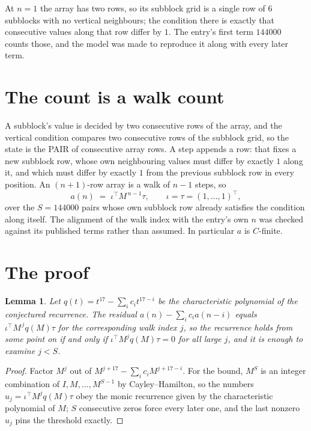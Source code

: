 \documentclass[11pt,a4paper]{article}
\theoremstyle{plain}
\newtheorem{lemma}[theorem]{Lemma}
\theoremstyle{definition}
\begin{document}
At $n=1$ the array has two rows, so its subblock grid is a single row of $6$ subblocks with
no vertical neighbours; the condition there is exactly that consecutive values along that row
differ by $1$. The entry's first term $144000$ counts those, and the model was made to
reproduce it along with every later term.

\section{The count is a walk count}

A subblock's value is decided by two consecutive rows of the array, and the
vertical condition compares two consecutive rows of the subblock grid, so the state is the
PAIR of consecutive array rows. A step appends a row: that fixes a new subblock row, whose own
neighbouring values must differ by exactly $1$ along it, and which must differ by exactly
$1$ from the previous subblock row in every position. An $(n+1)$-row array is a walk of
$n-1$ steps, so
\[
a(n)\;=\;\iota^{\!\top}M^{\,n-1}\tau,\qquad\iota=\tau=(1,\dots,1)^{\!\top},
\]
over the $S=144000$ pairs whose own subblock row already satisfies the condition along itself.
The alignment of the walk index with the entry's own $n$ was checked against its published
terms rather than assumed. In particular $a$ is $C$-finite.

\section{The proof}

\begin{lemma}\label{lem:crit}
Let $q(t)=t^{17}-\sum_i c_it^{17-i}$ be the characteristic polynomial of the
conjectured recurrence. The residual $a(n)-\sum_ic_ia(n-i)$ equals
$\iota^{\!\top}M^{\,j}q(M)\tau$ for the corresponding walk index $j$, so the recurrence
holds from some point on if and only if $\iota^{\!\top}M^{j}q(M)\tau=0$ for all large $j$,
and it is enough to examine $j<S$.
\end{lemma}

\begin{proof}
Factor $M^{j}$ out of $M^{j+17}-\sum_ic_iM^{j+17-i}$. For the bound, $M^{S}$
is an integer combination of $I,M,\dots,M^{S-1}$ by Cayley--Hamilton, so the numbers
$u_j=\iota^{\!\top}M^{j}q(M)\tau$ obey the monic recurrence given by the characteristic
polynomial of $M$; $S$ consecutive zeros force every later one, and the last nonzero $u_j$
pins the threshold exactly.
\end{proof}
\end{document}
